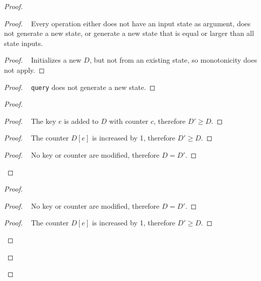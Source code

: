 \documentclass[11pt, oneside]{article}   	%
\begin{document}
\begin{proof}
	\begin{proof}
		\pfsketch~ Every operation either does not have an input state as argument, does not generate a new state, or generate a new state that is equal or larger than all state inputs.
		\begin{proof}
			\pf~ Initializes a new $D$, but not from an existing state, so monotonicity does not apply.
		\end{proof}
		
		\begin{proof}
			\pf~ \texttt{query} does not generate a new state.
		\end{proof}
		
		\begin{proof}
			\begin{proof}
				\pf~ The key $e$ is added to $D$ with counter $c$, therefore $D' \geq D$.
			\end{proof}
			
			\begin{proof}
				\pf~ The counter $D[e]$ is increased by 1, therefore $D' \geq D$.
			\end{proof}
			
			\begin{proof}
				\pf~ No key or counter are modified, therefore $D=D'$.
			\end{proof}
		\end{proof}
		
		\begin{proof}
			\begin{proof}
				\pf~ No key or counter are modified, therefore $D=D'$.
			\end{proof}
			
			\begin{proof}
				\pf~ The counter $D[e]$ is increased by 1, therefore $D' \geq D$.
			\end{proof}
			

\end{proof}
\end{proof}
\end{proof}
\end{document}
